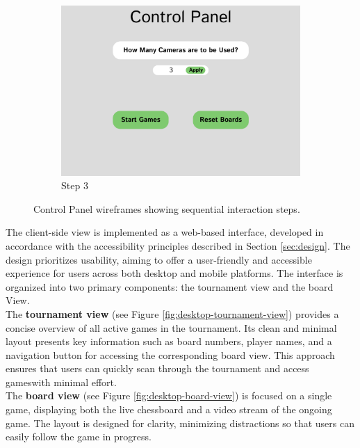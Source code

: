 \begin{figure}[h!]
    \begin{subfigure}[h!]{0.40\linewidth}
        \centering
        \includegraphics[width=\linewidth]{figures/methods/wireframes/control-panel-3.png}
        \caption{Step 3}
        \label{fig:control-panel-3}
    \end{subfigure}
    
    \caption[Control panel wireframes]{Control Panel wireframes showing sequential interaction steps.}
    \label{fig:control-panel-group}
\end{figure}


The client-side view is implemented as a web-based interface, developed in accordance with the accessibility principles described in Section \ref{sec:design}. The design prioritizes usability, aiming to offer a user-friendly and accessible experience for users across both desktop and mobile platforms. The interface is organized into two primary components: the tournament view and the board View. \\

The \textbf{tournament view} (see Figure \ref{fig:desktop-tournament-view}) provides a concise overview of all active games in the tournament. Its clean and minimal layout presents key information such as board numbers, player names, and a navigation button for accessing the corresponding board view. This approach ensures that users can quickly scan through the tournament and access gameswith minimal effort. \\

The \textbf{board view} (see Figure \ref{fig:desktop-board-view}) is focused on a single game, displaying both the live chessboard and a video stream of the ongoing game. The layout is designed for clarity, minimizing distractions so that users can easily follow the game in progress. \\

